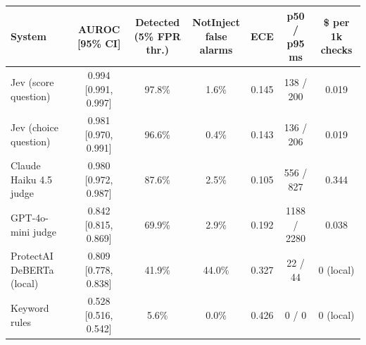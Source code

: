 \begin{tabular}{lcccccc}
\toprule
System & AUROC [95\% CI] & \makecell{Detected\\(5\% FPR thr.)} & \makecell{NotInject\\false alarms} & ECE & \makecell{p50 / p95\\ms} & \makecell{\$ per\\1k checks} \\
\midrule
Jev (score question) & 0.994 [0.991, 0.997] & 97.8\% & 1.6\% & 0.145 & 138 / 200 & 0.019 \\
Jev (choice question) & 0.981 [0.970, 0.991] & 96.6\% & 0.4\% & 0.143 & 136 / 206 & 0.019 \\
Claude Haiku 4.5 judge & 0.980 [0.972, 0.987] & 87.6\% & 2.5\% & 0.105 & 556 / 827 & 0.344 \\
GPT-4o-mini judge & 0.842 [0.815, 0.869] & 69.9\% & 2.9\% & 0.192 & 1188 / 2280 & 0.038 \\
ProtectAI DeBERTa (local) & 0.809 [0.778, 0.838] & 41.9\% & 44.0\% & 0.327 & 22 / 44 & 0 (local) \\
Keyword rules & 0.528 [0.516, 0.542] & 5.6\% & 0.0\% & 0.426 & 0 / 0 & 0 (local) \\
\bottomrule
\end{tabular}
